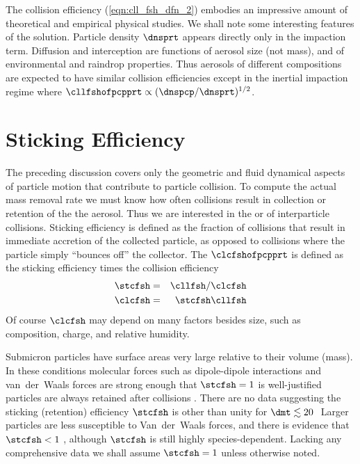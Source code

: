 \documentclass[12pt,twoside]{book}
\begin{document}
The collision efficiency (\ref{eqn:cll_fsh_dfn_2}) embodies an
impressive amount of theoretical and empirical physical studies.
We shall note some interesting features of the solution.
Particle density $\dnsprt$ appears directly only in the impaction
term. 
Diffusion and interception are functions of aerosol size (not mass), 
and of environmental and raindrop properties.
Thus aerosols of different compositions are expected to have similar
collision efficiencies except in the inertial impaction regime where
$\cllfshofpcpprt \propto (\dnspcp/\dnsprt)^{1/2}$.

\section[Sticking Efficiency]{Sticking Efficiency}\label{sxn:stc_fsh}
The preceding discussion covers only the geometric and fluid dynamical
aspects of particle motion that contribute to particle collision.
To compute the actual mass removal rate we must know how often 
collisions result in collection or retention of the the aerosol.
Thus we are interested in the  or
 of interparticle collisions.
Sticking efficiency is defined as the fraction of collisions that 
result in immediate accretion of the collected particle, as opposed to
collisions where the particle simply ``bounces off'' the collector.
The  $\clcfshofpcpprt$ is defined as the  
sticking efficiency times the collision efficiency 
\begin{eqnarray}
\stcfsh & = & \cllfsh / \clcfsh \\
\label{eqn:stc_fsh_dfn}
\clcfsh & = & \stcfsh \cllfsh
\label{eqn:clc_fsh_dfn}
\end{eqnarray}
Of course $\clcfsh$ may depend on many factors besides size, such as
composition, charge, and relative humidity. 

Submicron particles have surface areas very large relative to their
volume (mass). 
In these conditions molecular forces such as dipole-dipole
interactions and van~der~Waals forces are strong enough that $\stcfsh
= 1$ is well-justified particles are always retained after collisions
\cite[]{Sli82}. 
There are no data suggesting the sticking (retention) efficiency 
$\stcfsh$ is other than unity for $\dmt \lesssim 20$\,\um\
Larger particles are less susceptible to Van~der~Waals forces, and
there is evidence that $\stcfsh < 1$ \cite[][p.~330]{Sli82}, although
$\stcfsh$ is still highly species-dependent.
Lacking any comprehensive data we shall assume $\stcfsh = 1$ unless
otherwise noted. 
\end{document}
